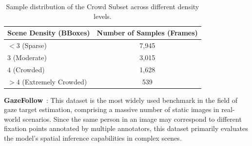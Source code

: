 \documentclass[sigconf,review,anonymous,screen]{acmart}
\begin{document}
\begin{table}[h]
  \centering
  \caption{Sample distribution of the Crowd Subset across different density levels.}
  \label{tab:crowd_distribution}
  \begin{tabular}{lc}
    \toprule
    \textbf{Scene Density (BBoxes)} & \textbf{Number of Samples (Frames)} \\
    \midrule
    $<3$ (Sparse) & 7,945 \\
    $3$ (Moderate) & 3,015 \\
    $4$ (Crowded) & 1,628 \\
    $>4$ (Extremely Crowded) & 539 \\
    \bottomrule
  \end{tabular}
\end{table}
\textbf{GazeFollow}~\cite{recasens2015they}: This dataset is the most widely used benchmark in the field of gaze target estimation, comprising a massive number of static images in real-world scenarios. Since the same person in an image may correspond to different fixation points annotated by multiple annotators, this dataset primarily evaluates the model's spatial inference capabilities in complex scenes.
\end{document}

